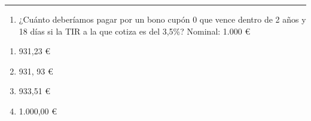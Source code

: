 \documentclass[
  letterpaper,
  DIV=11,
  numbers=noendperiod]{scrreprt}
\providecommand{\tightlist}{%
  \setlength{\itemsep}{0pt}\setlength{\parskip}{0pt}}\usepackage{longtable,booktabs,array}
\begin{document}
\begin{center}\rule{0.5\linewidth}{0.5pt}\end{center}

\begin{enumerate}
\def\labelenumi{\arabic{enumi}.}
\setcounter{enumi}{18}
\tightlist
\item
  ¿Cuánto deberíamos pagar por un bono cupón 0 que vence dentro de 2
  años y 18 días si la TIR a la que cotiza es del 3,5\%? Nominal: 1.000
  €
\end{enumerate}

\begin{enumerate}
\def\labelenumi{\alph{enumi}.}
\item
  931,23 €
\item
  931, 93 €
\item
  933,51 €
\item
  1.000,00 €
\end{enumerate}
\end{document}
